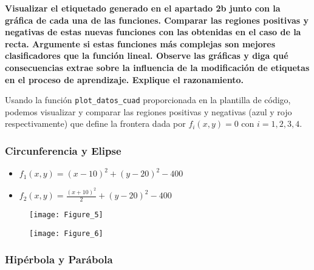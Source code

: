 \textbf{Visualizar el etiquetado generado en el apartado 2b junto con la gráfica de cada
una de las funciones.  Comparar las regiones positivas y negativas de estas
nuevas funciones con las obtenidas en el caso de la recta.  Argumente si estas
funciones más complejas son mejores clasificadores que la función lineal.
Observe las gráficas y diga qué consecuencias extrae sobre la influencia de la
modificación de etiquetas en el proceso de aprendizaje. Explique el
razonamiento.}

\hfill \break

Usando la función \texttt{plot_datos_cuad} proporcionada en
la plantilla de código, podemos visualizar y comparar las regiones positivas
y negativas (azul y rojo respectivamente) que define la frontera dada por
$f_i(x,y) = 0$ con $i=1,2,3,4$.

\subsubsection{Circunferencia y Elipse}

\begin{multicols}{2}
\begin{itemize}
\item $f_1(x,y) = (x - 10)^2 + (y - 20)^2 - 400$
\item $f_2(x,y) = \frac{(x + 10)^2}{2} + (y - 20)^2 - 400$
\end{itemize}
\end{multicols}

\begin{figure}[H]
  \begin{minipage}[b]{.5\linewidth}
    \centering
    \texttt{[image: Figure\_5]}
    \label{subfig-1:dummy}
  \end{minipage}
  \hfill \hfill
  \begin{minipage}[b]{.5\linewidth}
    \centering
    \texttt{[image: Figure\_6]}
    \label{subfig-2:dummy}
  \end{minipage}
  \label{fig:dummy}
\end{figure}

\hfill \break

\subsubsection{Hipérbola y Parábola}

